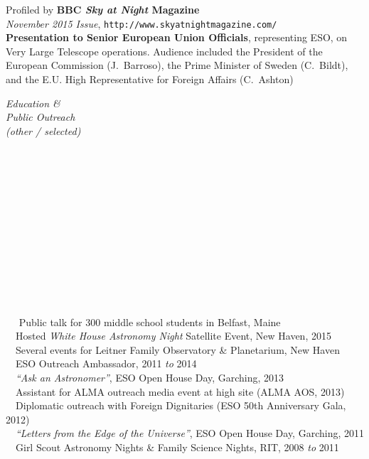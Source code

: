 \documentclass[11pt]{article}
\begin{document}
{Profiled by \textbf{BBC \textit{Sky at Night} Magazine} \\ \textit{November 2015 Issue},
{\footnotesize \texttt{http://www.skyatnightmagazine.com/}}\\

\textbf{Presentation to Senior European Union Officials}, representing ESO, on Very Large Telescope operations. Audience included
the President of the European Commission (J.~Barroso), the Prime Minister of Sweden (C.~Bildt), and the
E.U. High Representative for Foreign Affairs (C.~Ashton) \\ }


\vspace{4mm}




\hspace{2.5mm} \parbox{1.5in}{\textit{Education \& \\ Public Outreach \\ (other / selected) \\\\\\\\\\\\\\\\\\\\\\\\\\}} \parbox{5.15in}{
\textbullet~~ Public talk for 300 middle school students in Belfast, Maine\\
\textbullet~~Hosted \textit{White House Astronomy Night} Satellite Event, New Haven, 2015
\\
\textbullet~~Several events for Leitner Family Observatory \& Planetarium, New Haven
\\
\textbullet~~ESO Outreach Ambassador, 2011 \textit{to} 2014
\\\textbullet~~\textit{``Ask an Astronomer''}, ESO Open House Day, Garching, 2013
\\\textbullet~~Assistant for ALMA outreach media event at high site (ALMA AOS, 2013)
\\\textbullet~~Diplomatic outreach with Foreign Dignitaries (ESO 50th Anniversary Gala, 2012)
\\ \textbullet~~\textit{``Letters from the Edge of the Universe''}, ESO Open House Day, Garching, 2011
\\ \textbullet~~Girl Scout Astronomy Nights \& Family Science Nights, RIT, 2008 \textit{to} 2011
}
\end{document}

